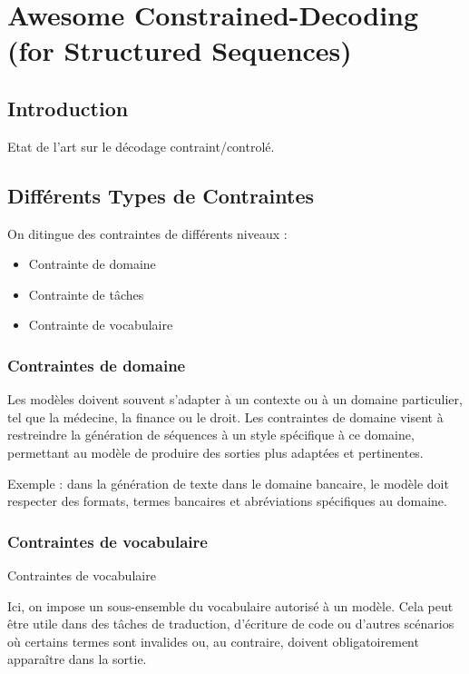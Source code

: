 
\section{Awesome Constrained-Decoding (for Structured
Sequences)}\label{awesome-constrained-decoding-for-structured-sequences}

\subsection{Introduction}\label{introduction}

Etat de l'art sur le décodage contraint/controlé.

\subsection{Différents Types de Contraintes}\label{diffuxe9rents-types-de-contraintes}

On ditingue des contraintes de différents niveaux :

\begin{itemize}
\tightlist
\item
  Contrainte de domaine
\item
  Contrainte de tâches
\item
  Contrainte de vocabulaire
\end{itemize}

\subsubsection{Contraintes de domaine}\label{contraintes-de-domaine}

Les modèles doivent souvent s'adapter à un contexte ou à un domaine
particulier, tel que la médecine, la finance ou le droit. Les
contraintes de domaine visent à restreindre la génération de séquences à
un style spécifique à ce domaine, permettant au modèle de produire des
sorties plus adaptées et pertinentes.

Exemple : dans la génération de texte dans le domaine bancaire, le
modèle doit respecter des formats, termes bancaires et abréviations
spécifiques au domaine.

\subsubsection{Contraintes de
vocabulaire}{Contraintes de vocabulaire}\label{contraintes-de-vocabulaire}

Ici, on impose un sous-ensemble du vocabulaire autorisé à un modèle.
Cela peut être utile dans des tâches de traduction, d'écriture de code
ou d'autres scénarios où certains termes sont invalides ou, au
contraire, doivent obligatoirement apparaître dans la sortie.

